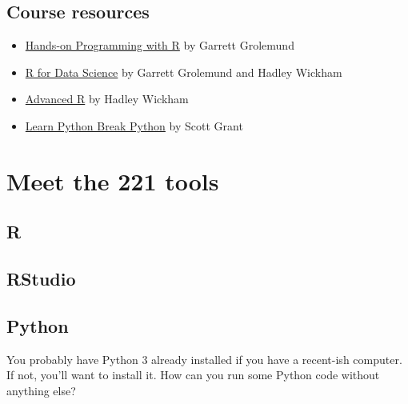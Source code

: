 \documentclass[
]{book}
\begin{document}
\hypertarget{course-resources}{%
\section{Course resources}\label{course-resources}}

\begin{itemize}
\item
  \href{https://rstudio-education.github.io/hopr/}{Hands-on Programming with R} by Garrett Grolemund
\item
  \href{https://r4ds.had.co.nz/}{R for Data Science} by Garrett Grolemund and Hadley Wickham
\item
  \href{https://adv-r.hadley.nz/}{Advanced R} by Hadley Wickham
\item
  \href{https://learnpythonbreakpython.com/}{Learn Python Break Python} by Scott Grant
\end{itemize}

\hypertarget{r-py}{%
\chapter{Meet the 221 tools}\label{r-py}}

\hypertarget{r}{%
\section{R}\label{r}}

\hypertarget{rstudio}{%
\section{RStudio}\label{rstudio}}

\hypertarget{python}{%
\section{Python}\label{python}}

You probably have Python 3 already installed if you have a recent-ish computer. If not, you'll want to install it. How can you run some Python code without anything else?
\end{document}
